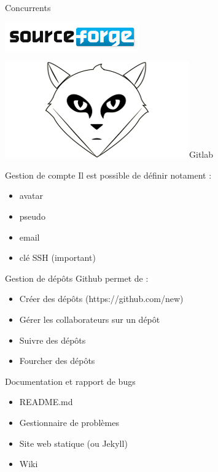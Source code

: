 \begin{frame}{Concurrents}

\begin{center}\includegraphics[scale=0.5]{sourceforge-logo.png}\end{center}

\begin{center}\includegraphics[scale=0.1]{gitlab-logo.png}{\Huge Gitlab}\end{center}

\end{frame}

\begin{frame}{Gestion de compte}
Il est possible de définir notament :
\begin{itemize}
	\item avatar
	\item pseudo
	\item email
	\item clé SSH (important)
\end{itemize}
\end{frame}

\begin{frame}{Gestion de dépôts}
Github permet de :
\begin{itemize}
	\item Créer des dépôts (https://github.com/new)
	\item Gérer les collaborateurs sur un dépôt
	\item Suivre des dépôts
	\item Fourcher des dépôts
\end{itemize}
\end{frame}

\begin{frame}{Documentation et rapport de bugs}
\begin{itemize}
	\item README.md
	\item Gestionnaire de problèmes
	\item Site web statique (ou Jekyll)
	\item Wiki
\end{itemize}
\end{frame}

